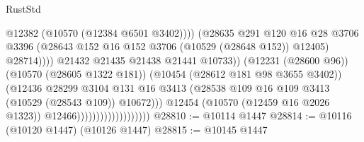 \begin{lexlean}{RustStd}
\begin{coremodule}
                                                          @12382
                                                          (@10570 (@12384 @6501 @3402))))
                                                      (@28635
                                                        @291
                                                        @120
                                                        @16
                                                        @28
                                                        @3706
                                                        @3396
                                                        (@28643
                                                          @152
                                                          @16
                                                          @152
                                                          @3706
                                                          (@10529 (@28648 @152))
                                                          @12405)
                                                        @28714))))
                                                @21432
                                                @21435
                                                @21438
                                                @21441
                                                @10733))
                                            (@12231 (@28600 @96))
                                            (@10570 (@28605 @1322 @181))
                                            (@10454 (@28612 @181 @98 @3655 @3402))
                                            (@12436
                                              @28299
                                              @3104
                                              @131
                                              @16
                                              @3413
                                              (@28538
                                                @109
                                                @16
                                                @109
                                                @3413
                                                (@10529 (@28543 @109))
                                                @10672)))
                                          @12454
                                          (@10570 (@12459 @16 @2026 @1323))
                                          @12466)))))))))))))))))))
@28810 := @10114 @1447
@28814 := @10116 (@10120 @1447) (@10126 @1447)
@28815 := @10145 @1447

\end{coremodule}
\end{lexlean}
